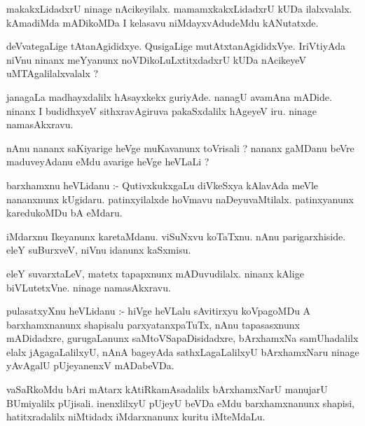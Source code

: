 \documentclass{article}
\begin{document}
\begin{mn}
makakxLidadxrU ninage nAcikeyilalx.  mamamxkakxLidadxrU  kUDa ilalxvalalx.  
kAmadiMda mADikoMDa I kelasavu niMdayxvAdudeMdu  kANutatxde.
\end{mn}

\begin{mn}
deVvategaLige tAtanAgididxye.  QusigaLige mutAtxtanAgididxVye. IriVtiyAda  niVnu 
ninanx  meYyanunx  noVDikoLuLxtitxdadxrU  kUDa nAcikeyeV uMTAgalilalxvalalx ?
\end{mn}

\begin{mn}
janagaLa madhayxdalilx hAsayxkekx guriyAde.  nanagU avamAna mADide.  ninanx I budidhxyeV  
sithxravAgiruva  pakaSxdalilx hAgeyeV iru. ninage namasAkxravu.
\end{mn}

\begin{mn}
nAnu nananx saKiyarige heVge muKavanunx toVrisali ?  nananx gaMDanu beVre 
maduveyAdanu eMdu  avarige  heVge heVLaLi ?
\end{mn}

\begin{mn}
barxhamxnu  heVLidanu :- QutivxkukxgaLu  diVkeSxya  kAlavAda meVle nananxnunx  kUgidaru.  
patinxyilalxde hoVmavu naDeyuvaMtilalx.  patinxyanunx karedukoMDu bA eMdaru.
\end{mn}

\begin{mn}
iMdarxnu Ikeyanunx karetaMdanu.  viSuNxvu koTaTxnu. nAnu parigarxhiside.  eleY suBurxveV, niVnu idanunx kaSxmisu.
\end{mn}

\begin{mn}
eleY suvarxtaLeV,  matetx tapapxnunx mADuvudilalx.  ninanx kAlige  biVLutetxVne.  ninage namasAkxravu.
\end{mn}

\begin{mn}
pulasatxyXnu heVLidanu :- hiVge heVLalu sAvitirxyu  koVpagoMDu A barxhamxnanunx  shapisalu  parxyatanxpaTuTx,  
nAnu  tapasasxnunx mADidadxre, gurugaLanunx  saMtoVSapaDisidadxre,  bArxhamxNa samUhadalilx elalx 
jAgagaLalilxyU, nAnA bageyAda sathxLagaLalilxyU bArxhamxNaru ninage yAvAgalU  pUjeyanenxV mADabeVDa.
\end{mn}

\begin{mn}
vaSaRkoMdu bAri mAtarx kAtiRkamAsadalilx  bArxhamxNarU  manujarU  BUmiyalilx  
pUjisali. inenxlilxyU  pUjeyU beVDa eMdu barxhamxnanunx shapisi,  hatitxradalilx niMtidadx iMdarxnanunx kuritu iMteMdaLu.
\end{mn}
\end{document}
